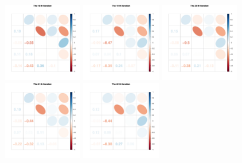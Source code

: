 \begin{figure}[h]
\includegraphics[width=0.3\textwidth,height=0.2\textheight]{Chapters/05MCMCOU/plots/paraEvolution/corMatrix18.pdf}
\includegraphics[width=0.3\textwidth,height=0.2\textheight]{Chapters/05MCMCOU/plots/paraEvolution/corMatrix19.pdf}
\includegraphics[width=0.3\textwidth,height=0.2\textheight]{Chapters/05MCMCOU/plots/paraEvolution/corMatrix20.pdf}
\includegraphics[width=0.3\textwidth,height=0.2\textheight]{Chapters/05MCMCOU/plots/paraEvolution/corMatrix21.pdf}
\includegraphics[width=0.3\textwidth,height=0.2\textheight]{Chapters/05MCMCOU/plots/paraEvolution/corMatrix22.pdf}

\end{figure}
